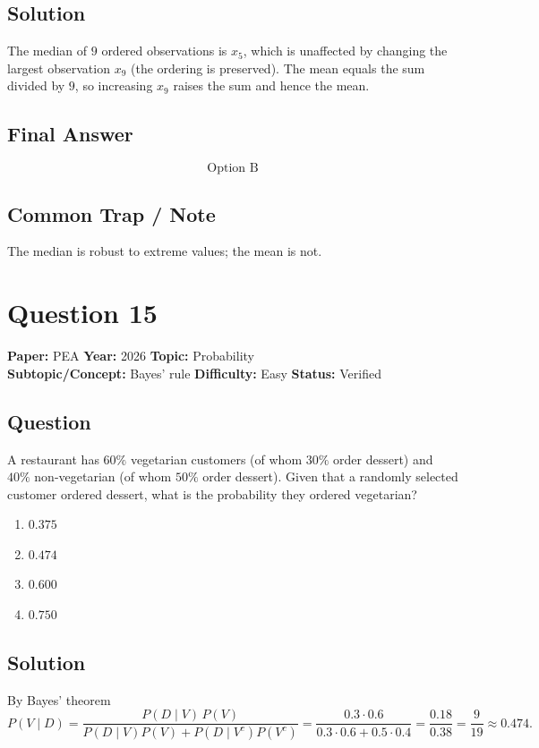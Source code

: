 \documentclass[11pt]{article}
\begin{document}
\subsection*{Solution}
The median of $9$ ordered observations is $x_5$, which is unaffected by changing
the largest observation $x_9$ (the ordering is preserved). The mean equals the
sum divided by $9$, so increasing $x_9$ raises the sum and hence the mean.

\subsection*{Final Answer}
\[
\boxed{\text{Option B}}
\]

\subsection*{Common Trap / Note}
The median is robust to extreme values; the mean is not.

\section*{Question 15}
\textbf{Paper:} PEA \quad \textbf{Year:} 2026 \quad \textbf{Topic:} Probability \\
\textbf{Subtopic/Concept:} Bayes' rule \quad
\textbf{Difficulty:} Easy \quad \textbf{Status:} Verified

\subsection*{Question}
A restaurant has $60\%$ vegetarian customers (of whom $30\%$ order dessert) and
$40\%$ non-vegetarian (of whom $50\%$ order dessert). Given that a randomly
selected customer ordered dessert, what is the probability they ordered vegetarian?
\begin{enumerate}[label=(\Alph*)]
\item $0.375$ \item $0.474$ \item $0.600$ \item $0.750$
\end{enumerate}

\subsection*{Solution}
By Bayes' theorem
\[
P(V \mid D) = \frac{P(D \mid V)\,P(V)}{P(D \mid V) P(V) + P(D \mid V^c) P(V^c)}
= \frac{0.3 \cdot 0.6}{0.3 \cdot 0.6 + 0.5 \cdot 0.4}
= \frac{0.18}{0.38}
= \frac{9}{19} \approx 0.474.
\]
\end{document}
